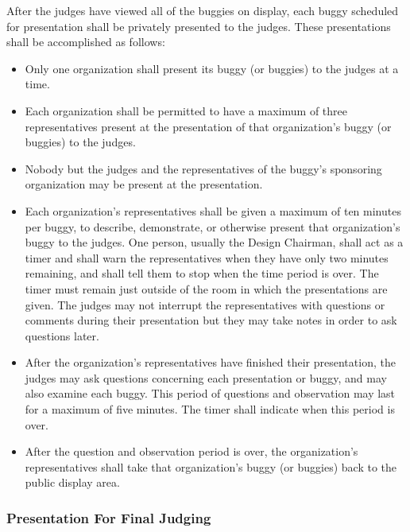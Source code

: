 	After the judges have viewed all of the buggies on display, each buggy
	scheduled for presentation shall be privately presented to the judges. These
	presentations shall be accomplished as follows:
	
	\begin{itemize}

		\item
		Only one organization shall present its buggy (or buggies) to the judges at a
		time.

		\item
		Each organization shall be permitted to have a maximum of three representatives
		present at the presentation of that organization's buggy (or buggies) to the
		judges.

		\item
		Nobody but the judges and the representatives of the buggy's sponsoring
		organization may be present at the presentation.

		\item
		Each organization's representatives shall be given a maximum of ten minutes per
		buggy, to describe, demonstrate, or otherwise present that organization's buggy
		to the judges. One person, usually the Design Chairman, shall act as a timer
		and shall warn the representatives when they have only two minutes remaining,
		and shall tell them to stop when the time period is over. The timer must remain
		just outside of the room in which the presentations are given. The judges may
		not interrupt the representatives with questions or comments during their
		presentation but they may take notes in order to ask questions later.

		\item
		After the organization's representatives have finished their presentation, the
		judges may ask questions concerning each presentation or buggy, and may also
		examine each buggy. This period of questions and observation may last for a
		maximum of five minutes. The timer shall indicate when this period is over.

		\item
		After the question and observation period is over, the organization's
		representatives shall take that organization's buggy (or buggies) back to the
		public display area.

	\end{itemize}

\subsubsection{Presentation For Final Judging}

